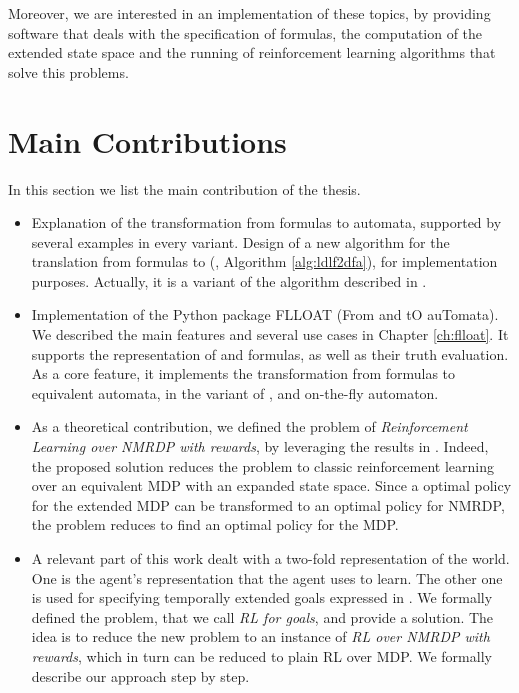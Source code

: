 Moreover, we are interested in an implementation of these topics, by providing software that deals with the specification of \LLf formulas, the computation of the extended state space and the running of reinforcement learning algorithms that solve this problems.

\section{Main Contributions}
In this section we list the main contribution of the thesis.
\begin{itemize}
	\item Explanation of the transformation from \LLf formulas to automata, supported by several examples in every variant. Design of a new algorithm for the translation from \LLf formulas to \DFA (\LDLfToDFA, Algorithm \ref{alg:ldlf2dfa}), for implementation purposes. Actually, it is a variant of the \LDLfToNFA algorithm described in \citep{AAAI1817342}.
	
	\item Implementation of the Python package FLLOAT (From \LTLf and \LDLf tO auTomata). We described the main features and several use cases in Chapter \ref{ch:flloat}. It supports the representation of \PL and \LLf formulas, as well as their truth evaluation. As a core feature, it implements the transformation from \LLf formulas to equivalent automata, in the variant of \LDLfToNFA, \LDLfToDFA and on-the-fly automaton.
	
	\item As a theoretical contribution, we defined the problem of \emph{Reinforcement Learning over NMRDP with \LLf rewards}, by leveraging the results in \citep{AAAI1817342}. Indeed, the proposed solution reduces the problem to classic reinforcement learning over an equivalent MDP with an expanded state space. Since a optimal policy for the extended MDP can be transformed to an optimal policy for NMRDP, the problem reduces to find an optimal policy for the MDP.
	
	\item A relevant part of this work dealt with a two-fold representation of the world. One is the agent's representation that the agent uses to learn. The other one is used for specifying temporally extended goals expressed in \LLf. We formally defined the problem, that we call \emph{RL for \LLf goals}, and provide a solution. The idea is to reduce the new problem to an instance of \emph{RL over NMRDP with \LLf rewards}, which in turn can be reduced to plain RL over MDP. We formally describe our approach step by step.
	

\end{itemize}
